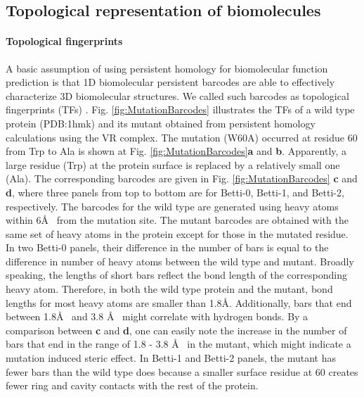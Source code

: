 \documentclass[10pt]{article}
\begin{document}
\subsection{Topological representation of biomolecules}


\paragraph{Topological fingerprints}
A basic assumption of using persistent homology for biomolecular function prediction is that 1D biomolecular persistent barcodes are able to effectively characterize 3D biomolecular structures. We called such barcodes as topological fingerprints (TFs) \cite{KLXia:2014c, KLXia:2015a}.   
Fig.  \ref{fig:MutationBarcodes} illustrates the TFs of a wild type protein (PDB:1hmk) and its mutant  obtained from persistent homology calculations using the VR complex. The mutation (W60A) occurred at residue 60 from Trp to Ala is shown at Fig.  \ref{fig:MutationBarcodes}{\bf a} and {\bf b}. Apparently, a large residue (Trp) at the protein surface is replaced by a relatively small one (Ala). The corresponding barcodes are given  in Fig.  \ref{fig:MutationBarcodes} {\bf c} and {\bf d}, where three panels from top to bottom are for  Betti-0, Betti-1, and Betti-2, respectively. The barcodes for the wild type are  generated using heavy atoms within 6\AA~ from the mutation site. 
The mutant barcodes are obtained with the same set of heavy atoms in the protein except for those in the mutated residue.   
In two Betti-0 panels, their difference in the number of bars is equal to the difference in number of heavy atoms between the wild type and mutant.  
Broadly speaking,  the lengths of short bars reflect the  bond length of the corresponding heavy atom. Therefore, in both the wild type protein and the mutant, bond lengths for most heavy atoms are smaller than 1.8\AA. Additionally, bars that end between 1.8\AA ~ and 3.8 \AA~ might correlate with  hydrogen bonds.  By a comparison between  {\bf c} and {\bf d}, one can easily note the increase in the number of bars that end in the range of 1.8 - 3.8 \AA~ in the mutant, which might indicate a mutation induced steric effect.  In  Betti-1 and Betti-2 panels, the mutant has fewer bars than the wild type does because a smaller surface residue at 60 creates fewer ring and cavity contacts with the rest of the protein.  
 
\end{document}
